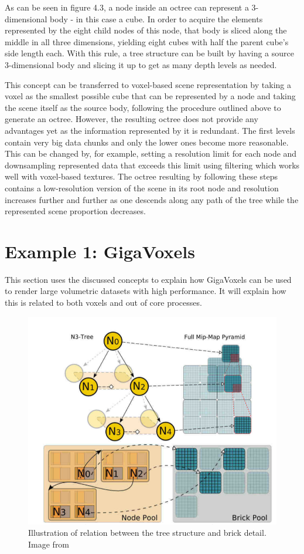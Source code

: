 As can be seen in figure 4.3, a node inside an octree can represent a 3-dimensional body - in this case a cube. In order to acquire the elements represented by the eight child nodes of this node, that body is sliced along the middle in all three dimensions, yielding eight cubes with half the parent cube's side length each. With this rule, a tree structure can be built by having a source 3-dimensional body and slicing it up to get as many depth levels as needed.

This concept can be transferred to voxel-based scene representation by taking a voxel as the smallest possible cube that can be represented by a node and taking the scene itself as the source body, following the procedure outlined above to generate an octree. However, the resulting octree does not provide any advantages yet as the information represented by it is redundant. The first levels contain very big data chunks and only the lower ones become more reasonable. This can be changed by, for example, setting a resolution limit for each node and downsampling represented data that exceeds this limit using filtering which works well with voxel-based textures. The octree resulting by following these steps contains a low-resolution version of the scene in its root node and resolution increases further and further as one descends along any path of the tree while the represented scene proportion decreases. 

\section{Example 1: GigaVoxels}

This section uses the discussed concepts to explain how GigaVoxels can be used to render large volumetric datasets with high performance. It will explain how this is related to both voxels and out of core processes.

\begin{figure}[h]
  \begin{center}
    \includegraphics[width=.4\textwidth]{logos/gigavoxels_structure.png}
    \caption{Illustration of relation between the tree structure and brick detail. Image from \cite{Crassin:2009:GRS:1507149.1507152}}
  \end{center}
\end{figure}

